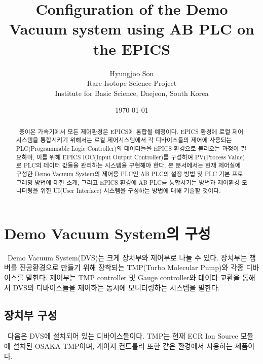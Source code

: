 \documentclass[11pt
  , a4paper
  , article
  , oneside
]{memoir}
\begin{document}
	
\newcommand{\technumber}{
  RAON Control-Document Series\\
  Revision : v1.0,   Release : January 21, 2014}
\title{\textbf{Configuration of the Demo Vacuum system using AB PLC on the EPICS}}

\author{Hyungjoo Son \\

  Rare Isotope Science Project\\
  Institute for Basic Science, Daejeon, South Korea
}
\date{\today}

\renewcommand{\maketitlehooka}{\begin{flushright}\textsf{\technumber}\end{flushright}}

\maketitle

\begin{abstract}\
  중이온 가속기에서 모든 제어환경은 EPICS에 통합될 예정이다. EPICS 환경에 로컬 제어시스템을 통합시키기 위해서는 로컬 제어시스템에서 각 디바이스들의 제어에 사용되는 PLC(Programmable Logic Controller)의 데이터들을 EPICS 환경으로 불러오는 과정이 필요하며, 이를 위해 EPICS IOC(Input Output Controller)를 구성하여 PV(Process Value)로 PLC의 데이터 값들을 관리하는 시스템을 구현해야 한다. 
  본 문서에서는 현재 제어실에 구성한 Demo Vacuum System의 제어용 PLC인 AB PLC의 설정 방법 및 PLC 기본 프로그래밍 방법에 대한 소개, 그리고 EPICS 환경에 AB PLC를 통합시키는 방법과 제어환경 모니터링을 위한 UI(User Interface) 시스템을 구성하는 방법에 대해 기술할 것이다.
\end{abstract}

\chapter{Demo Vacuum System의 구성}\
Demo Vacuum System(DVS)는 크게 장치부와 제어부로 나눌 수 있다. 장치부는 챔버를 진공환경으로 만들기 위해 장착되는 TMP(Turbo Molecular Pump)와 각종 디바이스를 말한다. 제어부는 TMP controller 및 Gauge controller와 데이터 교환을 통해서 DVS의 디바이스들을 제어하는 동시에 모니터링하는 시스템을 말한다.

\section{장치부 구성}\
다음은 DVS에 설치되어 있는 디바이스들이다. TMP는 현재 ECR Ion Source 모듈에 설치된 OSAKA TMP이며, 게이지 컨트롤러 또한 같은 환경에서 사용하는 제품이다.
\end{document}
